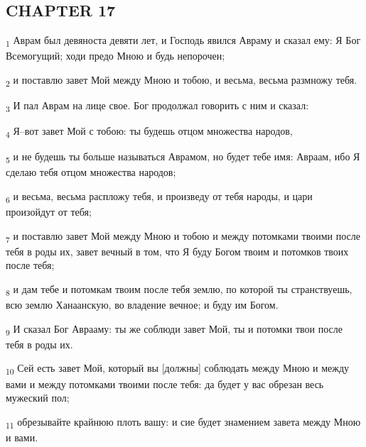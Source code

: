 \subsection{CHAPTER 17}
\begin{tcolorbox}
\textsubscript{1} Аврам был девяноста девяти лет, и Господь явился Авраму и сказал ему: Я Бог Всемогущий; ходи предо Мною и будь непорочен;
\end{tcolorbox}
\begin{tcolorbox}
\textsubscript{2} и поставлю завет Мой между Мною и тобою, и весьма, весьма размножу тебя.
\end{tcolorbox}
\begin{tcolorbox}
\textsubscript{3} И пал Аврам на лице свое. Бог продолжал говорить с ним и сказал:
\end{tcolorbox}
\begin{tcolorbox}
\textsubscript{4} Я--вот завет Мой с тобою: ты будешь отцом множества народов,
\end{tcolorbox}
\begin{tcolorbox}
\textsubscript{5} и не будешь ты больше называться Аврамом, но будет тебе имя: Авраам, ибо Я сделаю тебя отцом множества народов;
\end{tcolorbox}
\begin{tcolorbox}
\textsubscript{6} и весьма, весьма распложу тебя, и произведу от тебя народы, и цари произойдут от тебя;
\end{tcolorbox}
\begin{tcolorbox}
\textsubscript{7} и поставлю завет Мой между Мною и тобою и между потомками твоими после тебя в роды их, завет вечный в том, что Я буду Богом твоим и потомков твоих после тебя;
\end{tcolorbox}
\begin{tcolorbox}
\textsubscript{8} и дам тебе и потомкам твоим после тебя землю, по которой ты странствуешь, всю землю Ханаанскую, во владение вечное; и буду им Богом.
\end{tcolorbox}
\begin{tcolorbox}
\textsubscript{9} И сказал Бог Аврааму: ты же соблюди завет Мой, ты и потомки твои после тебя в роды их.
\end{tcolorbox}
\begin{tcolorbox}
\textsubscript{10} Сей есть завет Мой, который вы [должны] соблюдать между Мною и между вами и между потомками твоими после тебя: да будет у вас обрезан весь мужеский пол;
\end{tcolorbox}
\begin{tcolorbox}
\textsubscript{11} обрезывайте крайнюю плоть вашу: и сие будет знамением завета между Мною и вами.
\end{tcolorbox}

